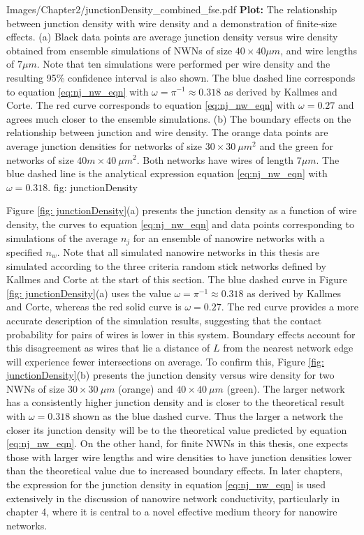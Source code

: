 {Images/Chapter2/junctionDensity_combined_fse.pdf}
{\textbf{Plot:} The relationship between junction density with wire density and a demonstration of finite-size effects.}
{(a) Black data points are average junction density versus wire density obtained from ensemble simulations of NWNs of size $40 \times 40 \mu m $, and wire lengths of $7 \mu m$. Note that ten simulations were performed per wire density and the resulting 95\% confidence interval is also shown. The blue dashed line corresponds to equation \ref{eq:nj_nw_eqn} with $\omega = \pi^{-1} \approx 0.318$ as derived by Kallmes and Corte\cite{ kallmes1960, sampson2008}. The red curve corresponds to equation \ref{eq:nj_nw_eqn} with $\omega = 0.27$ and agrees much closer to the ensemble simulations. (b) The boundary effects on the relationship between junction and wire density. The orange data points are average junction densities for networks of size $30\times 30~\mu m^2$ and the green for networks of size $40 m\times 40~\mu m^2$. Both networks have wires of length $7\mu m$. The blue dashed line is the analytical expression equation \ref{eq:nj_nw_eqn} with $\omega = 0.318$.}
{fig: junctionDensity}

Figure \ref{fig: junctionDensity}(a) presents the junction density as a function of wire density, the curves to equation \ref{eq:nj_nw_eqn} and data points corresponding to simulations of the average $n_j$ for an ensemble of nanowire networks with a specified $n_w$. Note that all simulated nanowire networks in this thesis are simulated according to the three criteria random stick networks defined by Kallmes and Corte\cite{ kallmes1960} at the start of this section. The blue dashed curve in Figure \ref{fig: junctionDensity}(a) uses the value $\omega =  \pi^{-1} \approx 0.318$ as derived by Kallmes and Corte\cite{ kallmes1960, sampson2008}, whereas the red solid curve is $\omega = 0.27$. The red curve provides a more accurate description of the simulation results, suggesting that the contact probability for pairs of wires is lower in this system. Boundary effects account for this disagreement as wires that lie a distance of $L$ from the nearest network edge will experience fewer intersections on average. To confirm this, Figure \ref{fig: junctionDensity}(b) presents the junction density versus wire density for two NWNs of size $30\times 30~\mu m$ (orange) and $40 \times 40~\mu m$ (green). The larger network has a consistently higher junction density and is closer to the theoretical result with $\omega = 0.318$ shown as the blue dashed curve. Thus the larger a network the closer its junction density will be to the theoretical value predicted by equation \ref{eq:nj_nw_eqn}. On the other hand, for finite NWNs in this thesis, one expects those with larger wire lengths and wire densities to have junction densities lower than the theoretical value due to increased boundary effects. In later chapters, the expression for the junction density in equation \ref{eq:nj_nw_eqn} is used extensively in the discussion of nanowire network conductivity, particularly in chapter 4, where it is central to a novel effective medium theory for nanowire networks.

